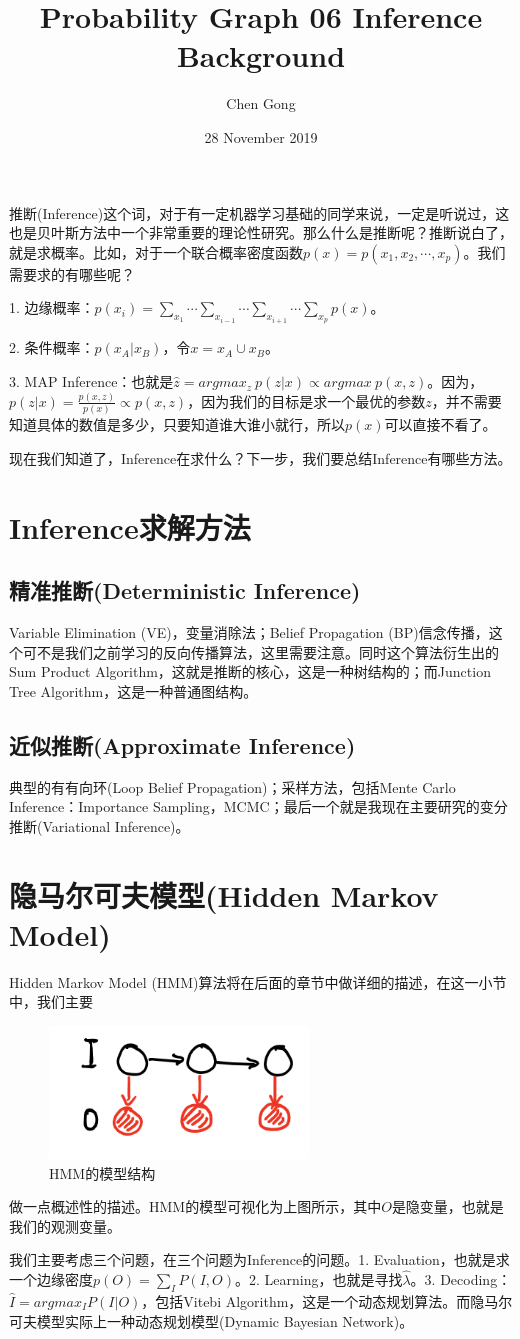 \documentclass[a4paper]{article}
\title{Probability Graph 06 Inference Background}
\author{Chen Gong}
\date{28 November 2019}
\begin{document}
\maketitle
推断(Inference)这个词，对于有一定机器学习基础的同学来说，一定是听说过，这也是贝叶斯方法中一个非常重要的理论性研究。那么什么是推断呢？推断说白了，就是求概率。比如，对于一个联合概率密度函数$p(x)=p(x_1,x_2,\cdots,x_p)$。我们需要求的有哪些呢？

1. 边缘概率：$p(x_i) = \sum_{x_1}\cdots\sum_{x_{i-1}}\cdots\sum_{x_{i+1}}\cdots\sum_{x_p}p(x)$。

2. 条件概率：$p(x_A|x_B)$，令$x=x_A\cup x_B$。

3. MAP Inference：也就是$\hat{z} = argmax_z\ p(z|x) \varpropto argmax \ p(x,z)$。因为，$p(z|x) = \frac{p(x,z)}{p(x)} \varpropto p(x,z)$，因为我们的目标是求一个最优的参数$z$，并不需要知道具体的数值是多少，只要知道谁大谁小就行，所以$p(x)$可以直接不看了。

现在我们知道了，Inference在求什么？下一步，我们要总结Inference有哪些方法。

\section{Inference求解方法}
\subsection{精准推断(Deterministic Inference)}
Variable Elimination (VE)，变量消除法；Belief Propagation (BP)信念传播，这个可不是我们之前学习的反向传播算法，这里需要注意。同时这个算法衍生出的Sum Product Algorithm，这就是推断的核心，这是一种树结构的；而Junction Tree Algorithm，这是一种普通图结构。

\subsection{近似推断(Approximate Inference)}
典型的有有向环(Loop Belief Propagation)；采样方法，包括Mente Carlo Inference：Importance Sampling，MCMC；最后一个就是我现在主要研究的变分推断(Variational Inference)。

\section{隐马尔可夫模型(Hidden Markov Model)}
Hidden Markov Model (HMM)算法将在后面的章节中做详细的描述，在这一小节中，我们主要
\begin{figure}[H]
    \centering
    \includegraphics[width=.3\textwidth]{微信图片_20191128115946.png}
    \caption{HMM的模型结构}
    \label{fig:my_label_1}
\end{figure}
做一点概述性的描述。HMM的模型可视化为上图所示，其中$O$是隐变量，也就是我们的观测变量。

我们主要考虑三个问题，在三个问题为Inference的问题。1. Evaluation，也就是求一个边缘密度$p(O) = \sum_I P(I,O)$。2. Learning，也就是寻找$\hat{\lambda}$。3. Decoding：$\hat{I} = argmax_I P(I|O)$，包括Vitebi Algorithm，这是一个动态规划算法。而隐马尔可夫模型实际上一种动态规划模型(Dynamic Bayesian Network)。
\end{document}
